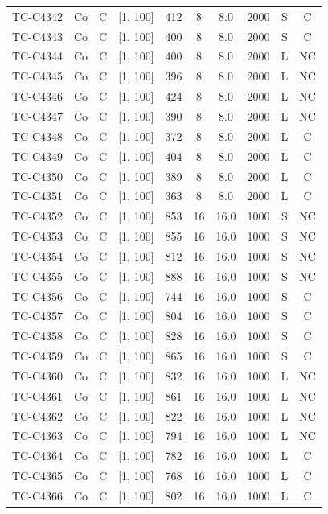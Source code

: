 \begin{longtable}{lccccccccc}
TC-C4342 & Co & C & [1, 100] & 412 & 8 & 8.0 & 2000 & S & C \\
TC-C4343 & Co & C & [1, 100] & 400 & 8 & 8.0 & 2000 & S & C \\
TC-C4344 & Co & C & [1, 100] & 400 & 8 & 8.0 & 2000 & L & NC \\
TC-C4345 & Co & C & [1, 100] & 396 & 8 & 8.0 & 2000 & L & NC \\
TC-C4346 & Co & C & [1, 100] & 424 & 8 & 8.0 & 2000 & L & NC \\
TC-C4347 & Co & C & [1, 100] & 390 & 8 & 8.0 & 2000 & L & NC \\
TC-C4348 & Co & C & [1, 100] & 372 & 8 & 8.0 & 2000 & L & C \\
TC-C4349 & Co & C & [1, 100] & 404 & 8 & 8.0 & 2000 & L & C \\
TC-C4350 & Co & C & [1, 100] & 389 & 8 & 8.0 & 2000 & L & C \\
TC-C4351 & Co & C & [1, 100] & 363 & 8 & 8.0 & 2000 & L & C \\
TC-C4352 & Co & C & [1, 100] & 853 & 16 & 16.0 & 1000 & S & NC \\
TC-C4353 & Co & C & [1, 100] & 855 & 16 & 16.0 & 1000 & S & NC \\
TC-C4354 & Co & C & [1, 100] & 812 & 16 & 16.0 & 1000 & S & NC \\
TC-C4355 & Co & C & [1, 100] & 888 & 16 & 16.0 & 1000 & S & NC \\
TC-C4356 & Co & C & [1, 100] & 744 & 16 & 16.0 & 1000 & S & C \\
TC-C4357 & Co & C & [1, 100] & 804 & 16 & 16.0 & 1000 & S & C \\
TC-C4358 & Co & C & [1, 100] & 828 & 16 & 16.0 & 1000 & S & C \\
TC-C4359 & Co & C & [1, 100] & 865 & 16 & 16.0 & 1000 & S & C \\
TC-C4360 & Co & C & [1, 100] & 832 & 16 & 16.0 & 1000 & L & NC \\
TC-C4361 & Co & C & [1, 100] & 861 & 16 & 16.0 & 1000 & L & NC \\
TC-C4362 & Co & C & [1, 100] & 822 & 16 & 16.0 & 1000 & L & NC \\
TC-C4363 & Co & C & [1, 100] & 794 & 16 & 16.0 & 1000 & L & NC \\
TC-C4364 & Co & C & [1, 100] & 782 & 16 & 16.0 & 1000 & L & C \\
TC-C4365 & Co & C & [1, 100] & 768 & 16 & 16.0 & 1000 & L & C \\
TC-C4366 & Co & C & [1, 100] & 802 & 16 & 16.0 & 1000 & L & C \\

\end{longtable}
